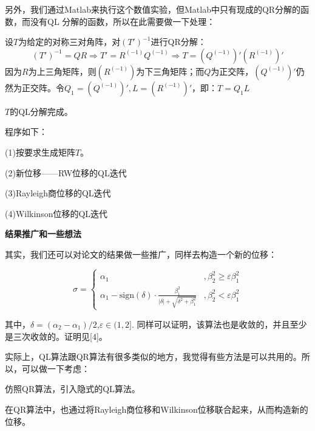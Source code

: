 \documentclass[12pt]{ctexart}
\begin{document}
另外，我们通过Matlab来执行这个数值实验，但Matlab中只有现成的QR分解的函数，而没有QL 分解的函数，所以在此需要做一下处理：

设$T$为给定的对称三对角阵，对$(T')^{-1}$进行QR分解：
\[(T')^{-1}=QR
\Rightarrow T'=R^{(-1)}Q^{(-1)}
\Rightarrow T=(Q^{(-1)})'(R^{(-1)})'
\]
因为$R$为上三角矩阵，则$(R^{(-1)})$为下三角矩阵；而$Q$为正交阵，$(Q^{(-1)})'$仍然为正交阵。令$Q_1=(Q^{(-1)})',L=(R^{(-1)})'$，即：$T=Q_1L$

$T$的QL分解完成。


程序如下：


(1)按要求生成矩阵$T$。




(2)新位移——RW位移的QL迭代


(3)Rayleigh商位移的QL迭代


(4)Wilkinson位移的QL迭代


\begin{center}
\textbf{结果推广和一些想法}
\end{center}

其实，我们还可以对论文的结果做一些推广，同样去构造一个新的位移：

\[
\sigma =
\begin{cases}
\alpha_1 & , \beta_2^2 \geq \varepsilon\beta_1^2 \\
\alpha_1 - \mathrm{sign}(\delta) \cdot
\frac{\beta_1^2}{\left\lvert\delta\right\rvert + \sqrt{\delta^2 +
    \beta_1^2}} & , \beta_2^2 < \varepsilon\beta_1^2
\end{cases}
\]

其中，$\delta=(\alpha_2-\alpha_1)/2$,$\varepsilon\in(1,2]$.
同样可以证明，该算法也是收敛的，并且至少是三次收敛的。证明见[4]。

实际上，QL算法跟QR算法有很多类似的地方，我觉得有些方法是可以共用的。所以，可以做一下考虑：

\parencite{nla}仿照QR算法，引入隐式的QL算法。

\parencite{ych1989}在QR算法中，也通过将Rayleigh商位移和Wilkinson位移联合起来，从而构造新的位移。

\clearpage

\nocite{ych1991,xjs1992}
\printbibliography
\end{document}
